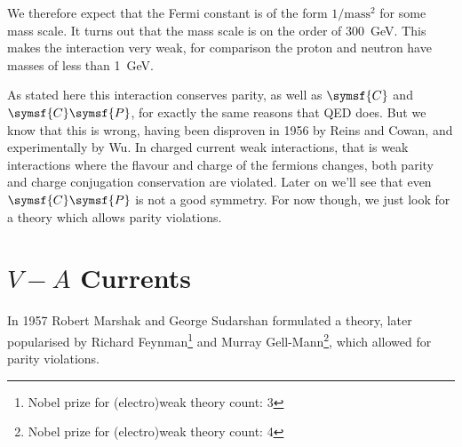 \documentclass[fleqn]{NotesClass}
\newcommand{\chargeConjugation}{\symsf{C}}
\newcommand{\parity}{\symsf{P}}
\begin{document}
    We therefore expect that the Fermi constant is of the form \(1/\text{mass}^2\) for some mass scale.
    It turns out that the mass scale is on the order of \qty{300}{\giga\electronvolt}.
    This makes the interaction very weak, for comparison the proton and neutron have masses of less than \qty{1}{\giga\electronvolt}.
    
    As stated here this interaction conserves parity, as well as \(\chargeConjugation\) and \(\chargeConjugation\parity\), for exactly the same reasons that QED does.
    But we know that this is wrong, having been disproven in 1956 by Reins and Cowan, and experimentally by Wu.
    In charged current weak interactions, that is weak interactions where the flavour and charge of the fermions changes, both parity and charge conjugation conservation are violated.
    Later on we'll see that even \(\chargeConjugation\parity\) is not a good symmetry.
    For now though, we just look for a theory which allows parity violations.
    
    \section{\texorpdfstring{\(V - A\)}{V - A} Currents}
    In 1957 Robert Marshak and George Sudarshan formulated a theory, later popularised by Richard Feynman\footnote{Nobel prize for (electro)weak theory count: 3} and Murray Gell-Mann\footnote{Nobel prize for (electro)weak theory count: 4}, which allowed for parity violations.
    
\end{document}
